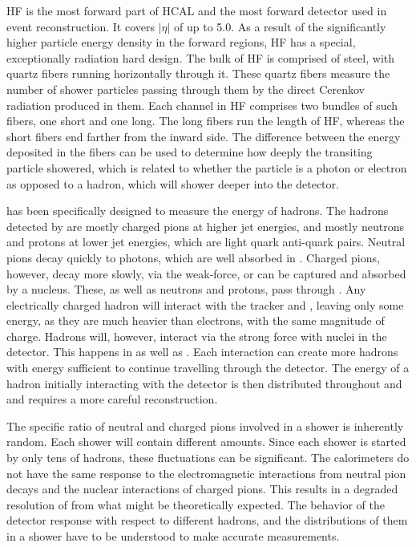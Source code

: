 HF is the most forward part of HCAL and the most forward detector used in event reconstruction.  It covers \ensuremath{|\eta|} of up to 5.0.  As a result of the significantly higher particle energy density in the forward regions, HF has a special, exceptionally radiation hard design. The bulk of HF is comprised of steel, with quartz fibers running horizontally through it. These quartz fibers measure the number of shower particles passing through them by the direct Cerenkov radiation produced in them. Each channel in HF comprises two bundles of such fibers, one short and one long. The long fibers run the length of HF, whereas the short fibers end farther from the inward side. The difference between the energy deposited in the fibers can be used to determine how deeply the transiting particle showered, which is related to whether the particle is a photon or electron as opposed to a hadron, which will shower deeper into the detector.

\HCAL has been specifically designed to measure the energy of hadrons. The hadrons detected by \HCAL are mostly charged pions at higher jet energies, and mostly neutrons and protons at lower jet energies, which are light quark anti-quark pairs.  Neutral pions decay quickly to photons, which are well absorbed in \ECAL.  Charged pions, however, decay more slowly, via the weak-force, or can be captured and absorbed by a nucleus. These, as well as neutrons and protons, pass through \ECAL.  Any electrically charged hadron will interact with the tracker and \ECAL, leaving only some energy, as they are much heavier than electrons, with the same magnitude of charge. Hadrons will, however, interact via the strong force with nuclei in the detector. This happens in \ECAL as well as \HCAL. Each interaction can create more hadrons with energy sufficient to continue travelling through the detector. The energy of a hadron initially interacting with the detector is then distributed throughout \ECAL and \HCAL and requires a more careful reconstruction.

The specific ratio of neutral and charged pions involved in a shower is inherently random.  Each shower will contain different amounts.  Since each shower is started by only tens of hadrons, these fluctuations can be significant.  The calorimeters do not have the same response to the electromagnetic interactions from neutral pion decays and the nuclear interactions of charged pions.  This results in a degraded resolution of \HCAL from what might be theoretically expected.  The behavior of the detector response with respect to different hadrons, and the distributions of them in a shower have to be understood to make accurate measurements.


